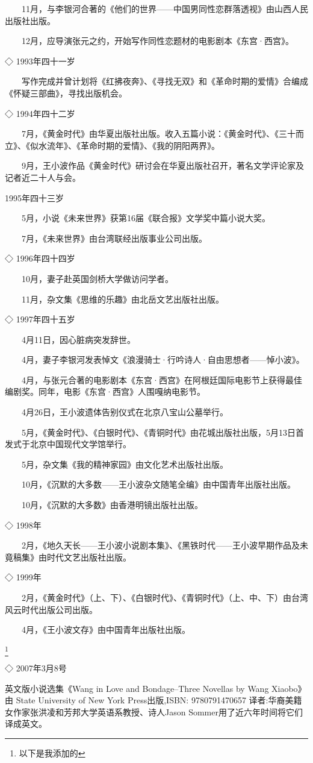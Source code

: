 　　11月，与李银河合著的《他们的世界——中国男同性恋群落透视》由山西人民出版社出版。

　　12月，应导演张元之约，开始写作同性恋题材的电影剧本《东宫·西宫》。

◇ 1993年四十一岁

　　写作完成并曾计划将《红拂夜奔》、《寻找无双》和《革命时期的爱情》合编成《怀疑三部曲》，寻找出版机会。

◇ 1994年四十二岁

　　7月，《黄金时代》由华夏出版社出版。收入五篇小说：《黄金时代》、《三十而立》、《似水流年》、《革命时期的爱情》、《我的阴阳两界》。

　　9月，王小波作品《黄金时代》研讨会在华夏出版社召开，著名文学评论家及记者近二十人与会。

1995年四十三岁

　　5月，小说《未来世界》获第16届《联合报》文学奖中篇小说大奖。

　　7月，《未来世界》由台湾联经出版事业公司出版。

◇ 1996年四十四岁

　　10月，妻子赴英国剑桥大学做访问学者。

　　11月，杂文集《思维的乐趣》由北岳文艺出版社出版。

◇ 1997年四十五岁

　　4月11日，因心脏病突发辞世。

　　4月，妻子李银河发表悼文《浪漫骑士·行吟诗人·自由思想者——悼小波》。

　　4月，与张元合著的电影剧本《东宫·西宫》在阿根廷国际电影节上获得最佳编剧奖。同年，电影《东宫·西宫》人围嘎纳电影节。

　　4月26日，王小波遗体告别仪式在北京八宝山公墓举行。

　　5月，《黄金时代》、《白银时代》、《青铜时代》由花城出版社出版，5月13日首发式于北京中国现代文学馆举行。

　　5月，杂文集《我的精神家园》由文化艺术出版社出版。

　　10月，《沉默的大多数——王小波杂文随笔全编》由中国青年出版社出版。

　　10月，《沉默的大多数》由香港明镜出版社出版。

◇ 1998年

　　2月，《地久天长——王小波小说剧本集》、《黑铁时代——王小波早期作品及未竟稿集》由时代文艺出版社出版。

◇ 1999年

　　2月，《黄金时代》（上、下）、《白银时代》、《青铜时代》（上、中、下）由台湾风云时代出版公司出版。

　　4月，《王小波文存》由中国青年出版社出版。

\footnote{以下是我添加的}

◇ 2007年3月8号

    英文版小说选集《Wang in Love and Bondage--Three Novellas by Wang Xiaobo》由 State University of New York Press出版,ISBN: 9780791470657 译者:华裔美籍女作家张洪凌和芳邦大学英语系教授、诗人Jason Sommer用了近六年时间将它们译成英文。


